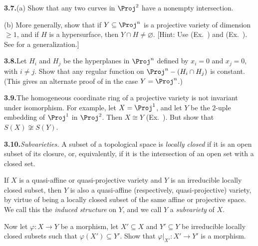{\smallskip
\noindent\hypertarget{ex-I-3.7}{}\textbf{3.7.}\enspace (a) Show that any two curves in $\Proj^2$ have a nonempty intersection.

(b) More generally, show that if $Y\subseteq\Proj^n$ is a projective variety of dimension $\geqslant1$, and if $H$ is a hypersurface, then $Y\cap H\ne\varnothing$. [Hint: Use (Ex.~) and (Ex.~). See  for a generalization.]

\smallskip
\noindent\hypertarget{ex-I-3.8}{}\textbf{3.8.}\enspace Let $H_i$ and $H_j$ be the hyperplanes in $\Proj^n$ defined by $x_i=0$ and $x_j=0$, with $i\ne j$. Show that any regular function on $\Proj^n-(H_i\cap H_j)$ is constant. (This gives an alternate proof of  in the case $Y=\Proj^n$.)

\smallskip
\noindent\hypertarget{ex-I-3.9}{}\textbf{3.9.}\enspace The homogeneous coordinate ring of a projective variety is not invariant under isomorphism. For example, let $X=\Proj^1$, and let $Y$ be the $2$-uple embedding of $\Proj^1$ in $\Proj^2$. Then $X\cong Y$ (Ex.~). But show that $S(X)\not\cong S(Y)$.

\smallskip
\noindent\hypertarget{ex-I-3.10}{}\textbf{3.10.}\enspace \emph{Subvarieties.} A subset of a topological space is \emph{locally closed} if it is an open subset of its closure, or, equivalently, if it is the intersection of an open set with a closed set.

If $X$ is a quasi-affine or quasi-projective variety and $Y$ is an irreducible locally closed subset, then $Y$ is also a quasi-affine (respectively, quasi-projective) variety, by virtue of being a locally closed subset of the same affine or projective space. We call this the \emph{induced structure} on $Y$, and we call $Y$ a \emph{subvariety} of $X$.

Now let $\varphi\colon X\to Y$ be a morphism, let $X'\subseteq X$ and $Y'\subseteq Y$ be irreducible locally closed subsets such that $\varphi(X')\subseteq Y'$. Show that $\varphi|_{X'}\colon X'\to Y'$ is a morphism.%
}

